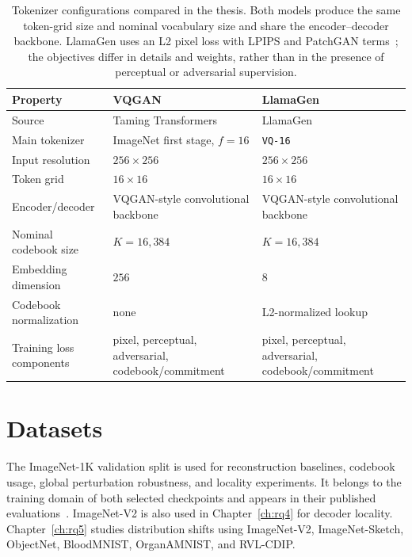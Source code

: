 \begin{table}[htbp]
    \centering
    \renewcommand{\arraystretch}{1.2}
    \begin{tabularx}{\textwidth}{>{\raggedright\arraybackslash}p{} >{\raggedright\arraybackslash}X >{\raggedright\arraybackslash}X}
        \textbf{Property} & \textbf{VQGAN} & \textbf{LlamaGen} \\ \hline
        Source & Taming Transformers~\cite{esser2021taming} & LlamaGen~\cite{sun2024llamagen} \\
        Main tokenizer & ImageNet first stage, $f=16$ & \texttt{VQ-16} \\
        Input resolution & $256\times256$ & $256\times256$ \\
        Token grid & $16\times16$ & $16\times16$ \\
        Encoder/decoder & VQGAN-style convolutional backbone & VQGAN-style convolutional backbone \\
        Nominal codebook size & $K=16{,}384$ & $K=16{,}384$ \\
        Embedding dimension & $256$ & $8$ \\
        Codebook normalization & none & L2-normalized lookup \\
        Training loss components & pixel, perceptual, adversarial, codebook/commitment & pixel, perceptual, adversarial, codebook/commitment \\
    \end{tabularx}
    \caption{Tokenizer configurations compared in the thesis. Both models produce the same token-grid size and nominal vocabulary size and share the encoder--decoder backbone. LlamaGen uses an L2 pixel loss with LPIPS and PatchGAN terms~\cite{sun2024llamagen}; the objectives differ in details and weights, rather than in the presence of perceptual or adversarial supervision.}
    \label{tab:model_config_summary}
\end{table}

\section{Datasets}
\label{sec:datasets}

The ImageNet-1K validation split is used for reconstruction baselines, codebook
usage, global perturbation robustness, and locality experiments. It belongs to
the training domain of both selected checkpoints and appears in their published
evaluations~\cite{esser2021taming,sun2024llamagen}. ImageNet-V2 is also used in
Chapter~\ref{ch:rq4} for decoder locality. Chapter~\ref{ch:rq5} studies
distribution shifts using ImageNet-V2, ImageNet-Sketch, ObjectNet, BloodMNIST,
OrganAMNIST, and RVL-CDIP.

